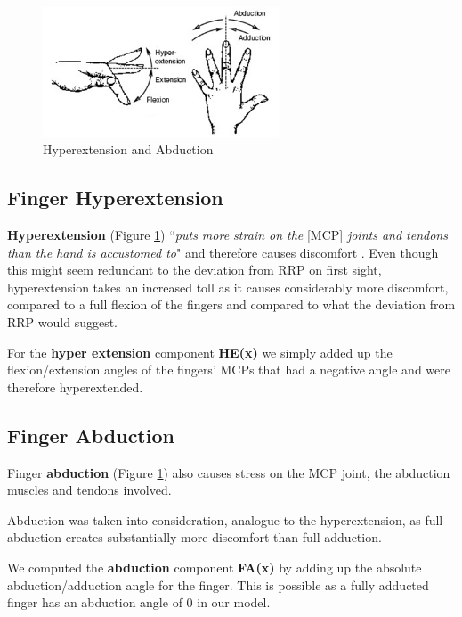\documentclass{sig-alternate-05-2015}
\begin{document}
\begin{figure}[b]
\centering
\vspace{-10pt}
\includegraphics[width=7cm]{abduction}
\vspace{-20pt}
\caption{Hyperextension and Abduction}
\label{fig:hyperabduction}
\vspace{-10pt}
\end{figure}

\subsection{Finger Hyperextension}

\textbf{Hyperextension} (Figure \ref{fig:hyperabduction}) ``\textit{puts more strain on the }[MCP] \textit{joints and tendons than the hand is accustomed to}" and therefore causes discomfort \cite{laviola1999survey}.
Even though this might seem redundant to the deviation from RRP on first sight, hyperextension takes an increased toll as it causes considerably more discomfort, compared to a full flexion of the fingers and compared to what the deviation from RRP would suggest.

For the \textbf{hyper extension} component \textbf{HE(x)} we simply added up the flexion/extension angles of the fingers' MCPs that had a negative angle and were therefore hyperextended.

\subsection{Finger Abduction}

Finger \textbf{abduction} (Figure \ref{fig:hyperabduction})
also causes stress on the MCP joint, the abduction muscles and tendons involved.

Abduction was taken into consideration, analogue to the hyperextension, as full abduction creates substantially more discomfort than full adduction.

We computed the \textbf{abduction} component \textbf{FA(x)} by adding up the absolute abduction/adduction angle for the finger. This is possible as a fully adducted finger has an abduction angle of 0 in our model.
\end{document}
